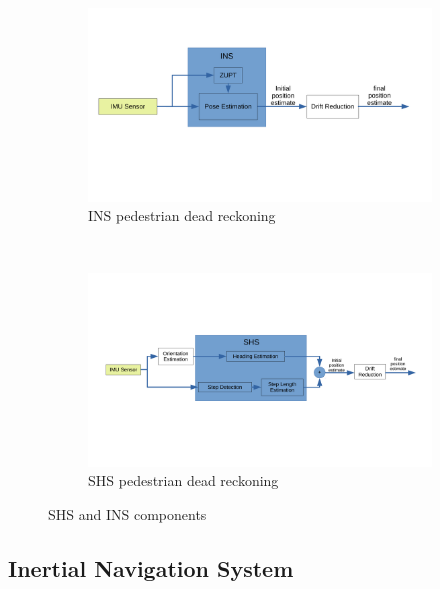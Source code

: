 \newpage
\begin{figure}[H]
	\centering
	\begin{subfigure}[t]{.7\textwidth}
		\centering
		\includegraphics[trim=20 140 50 80, clip, width=\linewidth]{images/INS_diagram}
		\caption{\ac{INS} pedestrian dead reckoning}
		\label{fig:ins_diagram}
	\end{subfigure}\\
	\begin{subfigure}[t]{0.7\textwidth}
		\centering
		\includegraphics[trim=40 120 40 80, clip,width=\linewidth]{images/shs_diagram}
		\caption{\ac{SHS} pedestrian dead reckoning}
		\label{fig:shs_diagram}
	\end{subfigure}
	\caption{SHS and INS components}
	\label{fig:SHS_INS_diagrams}
\end{figure}
     
\subsection{Inertial Navigation System}
\label{sec:INS}

